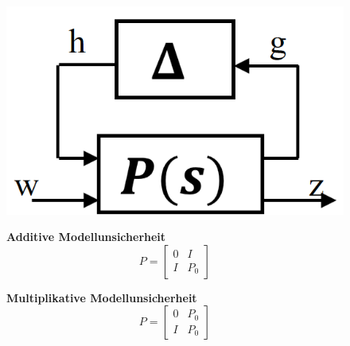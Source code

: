 \begin{figure}[!h]
	\begin{minipage}{0.25\linewidth}
		\includegraphics[width=.75\linewidth]{bilder/LFT1}
	\end{minipage}
	\begin{minipage}{0.35\linewidth}
		\footnotesize
		\textbf{Additive Modellunsicherheit}
		\begin{equation*}
			P = \begin{bmatrix}
				0 	& I\\
				I	& P_0
			\end{bmatrix}
		\end{equation*}
	\end{minipage}
	\begin{minipage}{0.35\linewidth}
		\footnotesize
		\textbf{Multiplikative Modellunsicherheit}
		\begin{equation*}
			P = \begin{bmatrix}
				0 	& P_0\\
				I	& P_0
			\end{bmatrix}
		\end{equation*}
	\end{minipage}
\end{figure}
\newpage